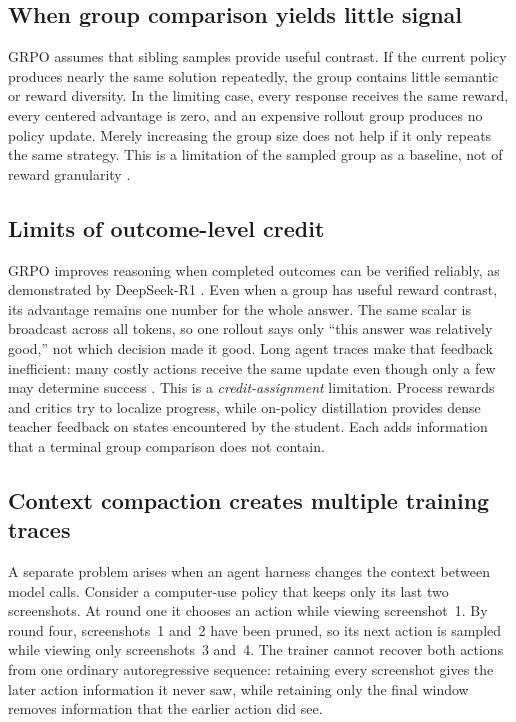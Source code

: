 \subsection{When group comparison yields little signal}

GRPO assumes that sibling samples provide useful contrast. If the current policy produces
nearly the same solution repeatedly, the group contains little semantic or reward
diversity. In the limiting case, every response receives the same reward, every centered
advantage is zero, and an expensive rollout group produces no policy update. Merely
increasing the group size does not help if it only repeats the same strategy. This is a
limitation of the sampled group as a baseline, not of reward granularity
\citep{shen2026firstprinciplesgrpo}.

\subsection{Limits of outcome-level credit}

GRPO improves reasoning when completed outcomes can be verified reliably, as demonstrated
by DeepSeek-R1 \citep{guo2025deepseekr1}. Even when a group has useful reward contrast, its
advantage remains one number for the whole answer. The same scalar is broadcast across all
tokens, so one rollout says only ``this answer was relatively good,'' not which decision
made it good. Long agent traces make that feedback inefficient: many costly actions receive
the same update even though only a few may determine success
\citep{shen2026firstprinciplesgrpo}. This is a \emph{credit-assignment} limitation. Process
rewards and critics try to localize progress, while on-policy distillation provides dense
teacher feedback on states encountered by the student. Each adds information that a
terminal group comparison does not contain.

\subsection{Context compaction creates multiple training traces}

A separate problem arises when an agent harness changes the context between model calls.
Consider a computer-use policy that keeps only its last two screenshots. At round one it
chooses an action while viewing screenshot~1. By round four, screenshots~1 and~2 have been
pruned, so its next action is sampled while viewing only screenshots~3 and~4. The trainer
cannot recover both actions from one ordinary autoregressive sequence: retaining every
screenshot gives the later action information it never saw, while retaining only the final
window removes information that the earlier action did see.


